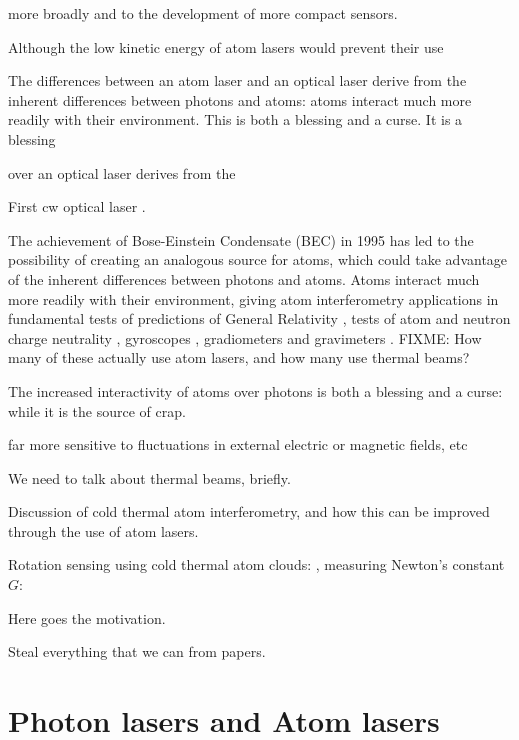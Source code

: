 more broadly and to the development of more compact sensors.  




Although the low kinetic energy of atom lasers would prevent their use 


The differences between an atom laser and an optical laser derive from the inherent differences between photons and atoms: atoms interact much more readily with their environment.  This is both a blessing and a curse.  It is a blessing

 over an optical laser derives from the 



First cw optical laser \citep{Javan:1961}.


The achievement of Bose-Einstein Condensate (BEC) in 1995 \citep{Anderson:1995vn,Bradley:1995ys,Davis:1995} has led to the possibility of creating an analogous source for atoms, which could take advantage of the inherent differences between photons and atoms.  Atoms interact much more readily with their environment, giving atom interferometry applications in fundamental tests of predictions of General Relativity \citep{Dimopoulos:2007uq}, tests of atom and neutron charge neutrality \citep{Arvanitaki:2008}, gyroscopes \citep{Gustavson:1997}, gradiometers \citep{Snadden:1998,McGuirk:2002} and gravimeters \citep{Peters:2001}.  FIXME: How many of these actually use atom lasers, and how many use thermal beams?

The increased interactivity of atoms over photons is both a blessing and a curse: while it is the source of crap.

far more sensitive to fluctuations in external electric or magnetic fields, etc


We need to talk about thermal beams, briefly.

Discussion of cold thermal atom interferometry, and how this can be improved through the use of atom lasers. 

Rotation sensing using cold thermal atom clouds: \citep{Canuel:2006}, measuring Newton's constant $G$: \citep{Lamporesi:2008}


Here goes the motivation.

Steal everything that we can from papers.

\section{Photon lasers and Atom lasers}
\label{Introduction:PhotonAndAtomLasers}

